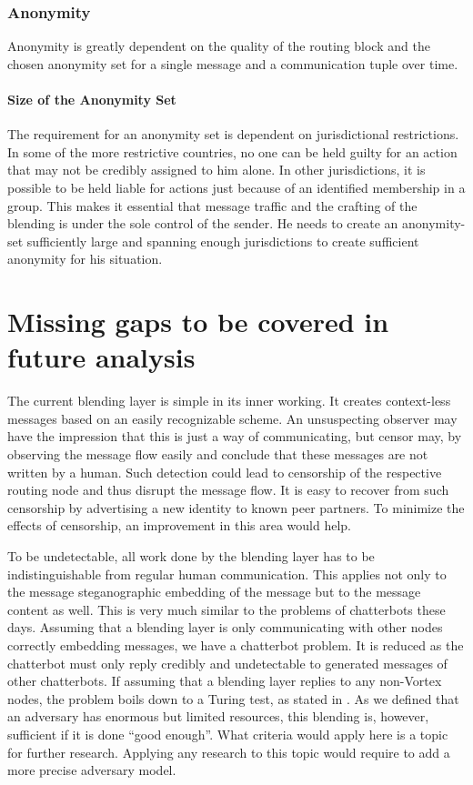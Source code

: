 \subsection{Anonymity}
Anonymity is greatly dependent on the quality of the routing block and the chosen anonymity set for a single message and a communication tuple over time. 

\subsubsection{Size of the Anonymity Set}
The requirement for an anonymity set is dependent on jurisdictional restrictions. In some of the more restrictive countries, no one can be held guilty for an action that may not be credibly assigned to him alone. In other jurisdictions, it is possible to be held liable for actions just because of an identified membership in a group. This makes it essential that message traffic and the crafting of the blending is under the sole control of the sender. He needs to create an anonymity-set sufficiently large and spanning enough jurisdictions to create sufficient anonymity for his situation.

\chapter{Missing gaps to be covered in future analysis}
The current blending layer is simple in its inner working. It creates context-less messages based on an easily recognizable scheme. An unsuspecting observer may have the impression that this is just a way of communicating, but censor may, by observing the message flow easily and conclude that these messages are not written by a human. Such detection could lead to censorship of the respective routing node and thus disrupt the message flow. It is easy to recover from such censorship by advertising a new identity to known peer partners. To minimize the effects of censorship, an improvement in this area would help.

To be undetectable, all work done by the blending layer has to be indistinguishable from regular human communication. This applies not only to the message steganographic embedding of the message but to the message content as well. This is very much similar to the problems of chatterbots these days. Assuming that a blending layer is only communicating with other nodes correctly embedding messages, we have a chatterbot problem. It is reduced as the chatterbot must only reply credibly and undetectable to generated messages of other chatterbots. If assuming that a blending layer replies to any non-Vortex nodes, the problem boils down to a Turing test, as stated in \cite{turing1950computing}. As we defined that an adversary has enormous but limited resources, this blending is, however, sufficient if it is done ``good enough''. What criteria would apply here is a topic for further research. Applying any research to this topic would require to add a more precise adversary model.

